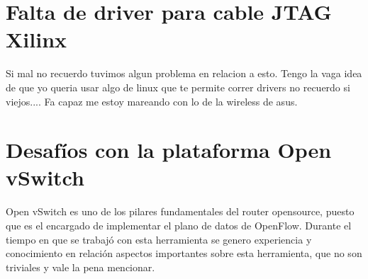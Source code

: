 \section{Falta de driver para cable JTAG Xilinx}
Si mal no recuerdo tuvimos algun problema en relacion a esto. Tengo la vaga idea de que yo queria usar algo de linux que te permite correr drivers no recuerdo si viejos.... Fa capaz me estoy mareando con lo de la wireless de asus.

\section{Desaf\'ios con la plataforma Open vSwitch}

Open vSwitch es uno de los pilares fundamentales del router opensource, puesto que es el encargado de implementar el plano de datos de OpenFlow. Durante el tiempo en que se trabaj\'o con esta herramienta se genero experiencia y conocimiento en relaci\'on aspectos importantes sobre esta herramienta, que no son triviales y vale la pena mencionar.\\ 

